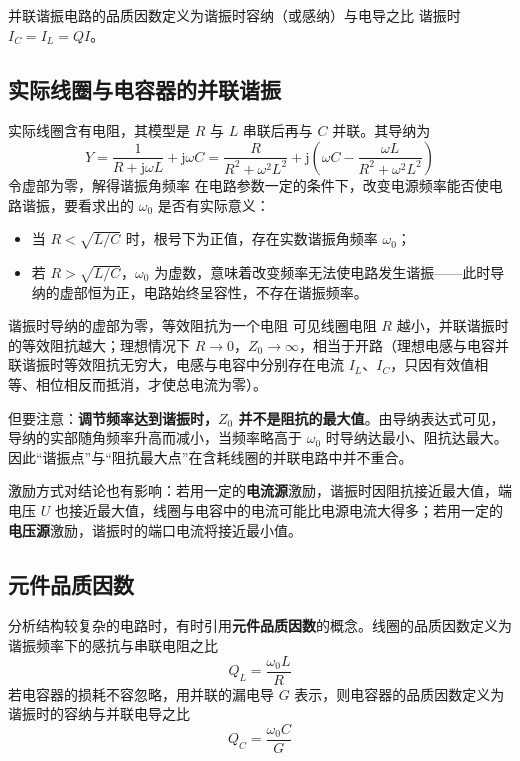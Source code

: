 并联谐振电路的品质因数定义为谐振时容纳（或感纳）与电导之比
谐振时 $I_C=I_L=QI$。

\subsection{实际线圈与电容器的并联谐振}
实际线圈含有电阻，其模型是 $R$ 与 $L$ 串联后再与 $C$ 并联。其导纳为
\begin{equation}
Y=\frac{1}{R+\mathrm{j}\omega L}+\mathrm{j}\omega C
=\frac{R}{R^2+\omega^2L^2}+\mathrm{j}\left(\omega C-\frac{\omega L}{R^2+\omega^2L^2}\right)
\end{equation}
令虚部为零，解得谐振角频率
在电路参数一定的条件下，改变电源频率能否使电路谐振，要看求出的 $\omega_0$ 是否有实际意义：
\begin{itemize}
  \item 当 $R<\sqrt{L/C}$ 时，根号下为正值，存在实数谐振角频率 $\omega_0$；
  \item 若 $R>\sqrt{L/C}$，$\omega_0$ 为虚数，意味着改变频率无法使电路发生谐振——此时导纳的虚部恒为正，电路始终呈容性，不存在谐振频率。
\end{itemize}

谐振时导纳的虚部为零，等效阻抗为一个电阻
可见线圈电阻 $R$ 越小，并联谐振时的等效阻抗越大；理想情况下 $R\to0$，$Z_0\to\infty$，相当于开路（理想电感与电容并联谐振时等效阻抗无穷大，电感与电容中分别存在电流 $I_L$、$I_C$，只因有效值相等、相位相反而抵消，才使总电流为零）。

但要注意：\textbf{调节频率达到谐振时，$Z_0$ 并不是阻抗的最大值}。由导纳表达式可见，导纳的实部随角频率升高而减小，当频率略高于 $\omega_0$ 时导纳达最小、阻抗达最大。因此“谐振点”与“阻抗最大点”在含耗线圈的并联电路中并不重合。

激励方式对结论也有影响：若用一定的\textbf{电流源}激励，谐振时因阻抗接近最大值，端电压 $U$ 也接近最大值，线圈与电容中的电流可能比电源电流大得多；若用一定的\textbf{电压源}激励，谐振时的端口电流将接近最小值。

\subsection{元件品质因数}
分析结构较复杂的电路时，有时引用\textbf{元件品质因数}的概念。线圈的品质因数定义为谐振频率下的感抗与串联电阻之比
\begin{equation}
Q_L=\frac{\omega_0L}{R}
\end{equation}
若电容器的损耗不容忽略，用并联的漏电导 $G$ 表示，则电容器的品质因数定义为谐振时的容纳与并联电导之比
\begin{equation}
Q_C=\frac{\omega_0C}{G}
\end{equation}

